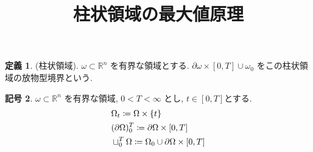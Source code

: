 \documentclass[10pt, fleqn, label-section=none]{bxjsarticle}
\title{柱状領域の最大値原理}
\date{}
\author{}
\theoremstyle{definition}
\newtheorem{dfn}{定義}[section]
\newtheorem{notation}[dfn]{記号}
\newcommand{\cbra}[1]{\mleft\{#1\mright\}}
\renewcommand{\;}{\, ; \,}
\begin{document}
\maketitle

\section{}

\begin{dfn}(柱状領域). $\omega \subset \mathbb R^n$ を有界な領域とする. $\partial \omega \times [0, T] \cup \omega_0$ をこの柱状領域の放物型境界という. 

\end{dfn}

\begin{notation}$\omega \subset \mathbb R^n$ を有界な領域, $0 < T < \infty$ とし, $t \in [0, T]$とする. 
\begin{align*} &\Omega_t \coloneqq \Omega \times \cbra{t}  \\ &  (\partial \Omega)_0^T \coloneqq \partial \Omega \times [0, T]    \\& \sqcup_0^T  \Omega \coloneqq  \Omega_0 \cup \partial \Omega \times [0, T]  \end{align*}

\end{notation}
\end{document}
